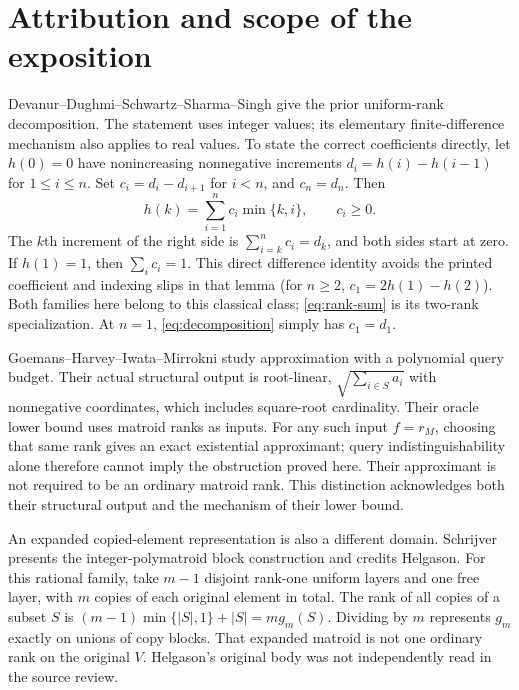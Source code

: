 \documentclass[11pt]{article}
\begin{document}
\section{Attribution and scope of the exposition}
Devanur--Dughmi--Schwartz--Sharma--Singh \cite[Appendix~D, Lemma~D.1]{ddsss} give the prior uniform-rank decomposition. The statement uses integer values; its elementary finite-difference mechanism also applies to real values. To state the correct coefficients directly, let $h(0)=0$ have nonincreasing nonnegative increments $d_i=h(i)-h(i-1)$ for $1\le i\le n$. Set $c_i=d_i-d_{i+1}$ for $i<n$, and $c_n=d_n$. Then
\begin{equation}\label{eq:decomposition}
 h(k)=\sum_{i=1}^n c_i\min\{k,i\},\qquad c_i\ge0.
\end{equation}
The $k$th increment of the right side is $\sum_{i=k}^n c_i=d_k$, and both sides start at zero. If $h(1)=1$, then $\sum_i c_i=1$. This direct difference identity avoids the printed coefficient and indexing slips in that lemma (for $n\ge2$, $c_1=2h(1)-h(2)$). Both families here belong to this classical class; \eqref{eq:rank-sum} is its two-rank specialization. At $n=1$, \eqref{eq:decomposition} simply has $c_1=d_1$.

Goemans--Harvey--Iwata--Mirrokni \cite{ghim,ghimfull} study approximation with a polynomial query budget. Their actual structural output is root-linear, $\sqrt{\sum_{i\in S}a_i}$ with nonnegative coordinates, which includes square-root cardinality. Their oracle lower bound uses matroid ranks as inputs. For any such input $f=r_M$, choosing that same rank gives an exact existential approximant; query indistinguishability alone therefore cannot imply the obstruction proved here. Their approximant is not required to be an ordinary matroid rank. This distinction acknowledges both their structural output and the mechanism of their lower bound.

An expanded copied-element representation is also a different domain. Schrijver \cite[Section~44.6b]{schrijver} presents the integer-polymatroid block construction and credits Helgason. For this rational family, take $m-1$ disjoint rank-one uniform layers and one free layer, with $m$ copies of each original element in total. The rank of all copies of a subset $S$ is $(m-1)\min\{|S|,1\}\allowbreak+|S|\allowbreak=m g_m(S)$. Dividing by $m$ represents $g_m$ exactly on unions of copy blocks. That expanded matroid is not one ordinary rank on the original $V$. Helgason's original body was not independently read in the source review.
\end{document}

